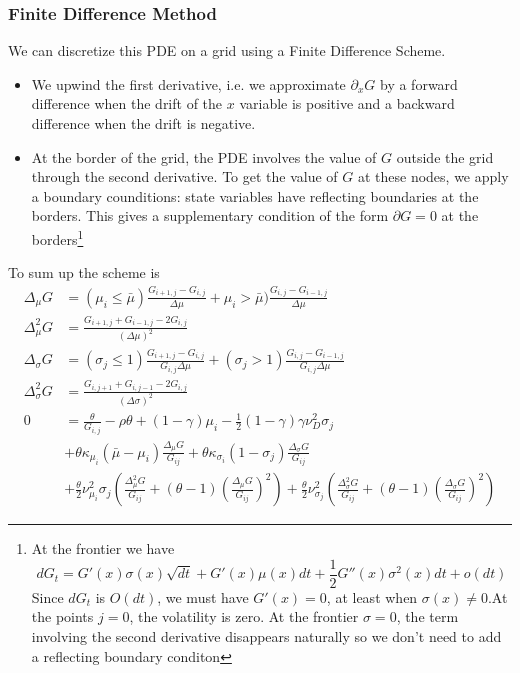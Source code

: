 \documentclass[english]{article}
\begin{document}
\subsubsection{Finite Difference Method}
We can discretize this PDE on a grid using a Finite Difference Scheme. 
\begin{itemize}
	\item We upwind the first derivative, i.e. we approximate $\partial_x G$ by a forward difference when the drift of the $x$ variable is positive and a backward difference when the drift is negative. 
	\item At the border of the grid, the PDE involves the value of $G$ outside the grid through the second derivative. To get the value of $G$ at these nodes, we apply a boundary counditions: state variables have reflecting boundaries at the borders. This gives a supplementary condition of the form $\partial G = 0$ at the borders\footnote{At the frontier we have $$dG_{t} = G'(x) \sigma(x) \sqrt{dt} + G'(x)\mu(x) dt + \frac{1}{2}G''(x)\sigma^2(x)dt + o(dt)$$
	Since $dG_t$ is $O(dt)$, we must have $G'(x) = 0$, at least when $\sigma(x) \neq 0$.At the points $j = 0$, the volatility is zero. 
	At the frontier $\sigma = 0$, the term involving the second derivative disappears naturally so we don't need to add a reflecting boundary conditon}
\end{itemize}
To sum up the scheme is 
\begin{align*}
	\Delta_\mu G &= (\mu_i \leq \bar{\mu})\frac{G_{i+1, j}-G_{i, j}}{\Delta \mu}+ \mu_i > \bar{\mu})\frac{G_{i, j}-G_{i-1, j}}{\Delta \mu}\\
	\Delta^2_\mu G &= \frac{G_{i+1, j} + G_{i-1, j} - 2 G_{i,j}}{(\Delta \mu)^2}\\
	\Delta_\sigma G &= (\sigma_j \leq 1)\frac{G_{i+1, j}-G_{i, j}}{G_{i,j}\Delta \mu}+ (\sigma_j > 1)\frac{G_{i, j}-G_{i-1, j}}{G_{i,j}\Delta \mu}\\
	\Delta^2_\sigma G &= \frac{G_{i, j+1} + G_{i, j-1} - 2 G_{i,j}}{(\Delta \sigma)^2}\\
	0&= \frac{\theta}{G_{i,j}} - \rho \theta + (1-\gamma)\mu_i -\frac{1}{2}(1-\gamma)\gamma\nu_D^2\sigma_j\\
	&+\theta\kappa_{\mu_i}(\bar{\mu}-\mu_i) \frac{\Delta_\mu G}{G_{ij}}+ \theta\kappa_{\sigma_i}(1-\sigma_j)\frac{\Delta_\sigma G}{G_{ij}}\\
	&+\frac{\theta}{2}\nu^2_{\mu_i}\sigma_j(\frac{\Delta^2_\mu G}{G_{ij}} + (\theta-1)(\frac{\Delta_\mu G}{G_{ij}})^2) + \frac{\theta}{2}\nu^2_{\sigma_j}(\frac{\Delta^2_\sigma G}{G_{ij}} + (\theta-1)(\frac{\Delta_\sigma G}{G_{ij}})^2)
\end{align*}
\end{document}
